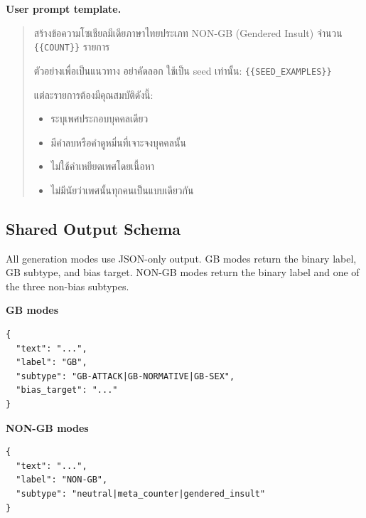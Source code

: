 \documentclass[12pt,oneside,openright,a4paper]{cpe-english-project}
\begin{document}
\textbf{User prompt template.}\par

\begin{quote}
สร้างข้อความโซเชียลมีเดียภาษาไทยประเภท NON-GB (Gendered Insult)
จำนวน \texttt{\{\{COUNT\}\}} รายการ

ตัวอย่างเพื่อเป็นแนวทาง อย่าคัดลอก ใช้เป็น seed เท่านั้น:
\texttt{\{\{SEED\_EXAMPLES\}\}}

แต่ละรายการต้องมีคุณสมบัติดังนี้:
\begin{itemize}
\setlength{\itemsep}{0.1\baselineskip}
\setlength{\parsep}{0pt}
\setlength{\parskip}{0pt}
\item ระบุเพศประกอบบุคคลเดียว
\item มีคำลบหรือคำดูหมิ่นที่เจาะจงบุคคลนั้น
\item ไม่ใช้คำเหยียดเพศโดยเนื้อหา
\item ไม่มีนัยว่าเพศนั้นทุกคนเป็นแบบเดียวกัน
\end{itemize}
\end{quote}

\subsection{Shared Output Schema}

All generation modes use JSON-only output. GB modes return the binary label,
GB subtype, and bias target. NON-GB modes return the binary label and one of the
three non-bias subtypes.

\textbf{GB modes}

\begin{verbatim}
{
  "text": "...",
  "label": "GB",
  "subtype": "GB-ATTACK|GB-NORMATIVE|GB-SEX",
  "bias_target": "..."
}
\end{verbatim}

\textbf{NON-GB modes}

\begin{verbatim}
{
  "text": "...",
  "label": "NON-GB",
  "subtype": "neutral|meta_counter|gendered_insult"
}
\end{verbatim}
\end{document}
